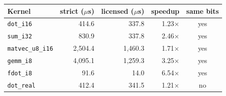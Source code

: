 \begin{tabular}{lrrrc}
\toprule
Kernel & strict ($\mu$s) & licensed ($\mu$s) & speedup & same bits\\
\midrule
\texttt{dot\_i16} & 414.6 & 337.8 & 1.23$\times$ & yes\\
\texttt{sum\_i32} & 830.9 & 337.8 & 2.46$\times$ & yes\\
\texttt{matvec\_u8\_i16} & 2,504.4 & 1,460.3 & 1.71$\times$ & yes\\
\texttt{gemm\_i8} & 4,095.1 & 1,259.3 & 3.25$\times$ & yes\\
\texttt{fdot\_i8} & 91.6 & 14.0 & 6.54$\times$ & yes\\
\texttt{dot\_real} & 412.4 & 341.5 & 1.21$\times$ & no\\
\bottomrule
\end{tabular}
